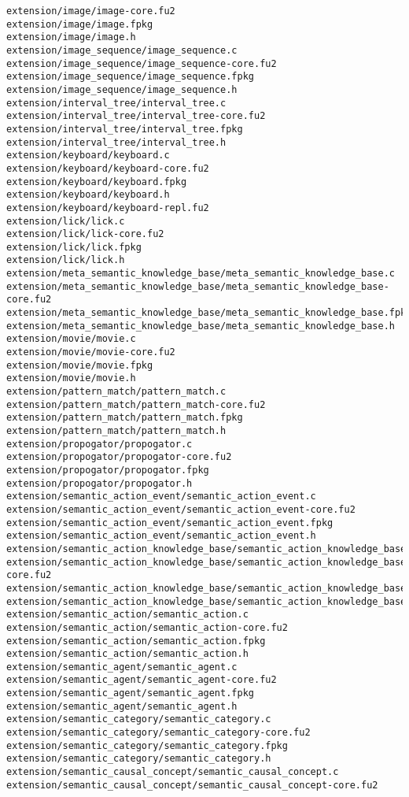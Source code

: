 \begin{lstlisting}
extension/image/image-core.fu2
extension/image/image.fpkg
extension/image/image.h
extension/image_sequence/image_sequence.c
extension/image_sequence/image_sequence-core.fu2
extension/image_sequence/image_sequence.fpkg
extension/image_sequence/image_sequence.h
extension/interval_tree/interval_tree.c
extension/interval_tree/interval_tree-core.fu2
extension/interval_tree/interval_tree.fpkg
extension/interval_tree/interval_tree.h
extension/keyboard/keyboard.c
extension/keyboard/keyboard-core.fu2
extension/keyboard/keyboard.fpkg
extension/keyboard/keyboard.h
extension/keyboard/keyboard-repl.fu2
extension/lick/lick.c
extension/lick/lick-core.fu2
extension/lick/lick.fpkg
extension/lick/lick.h
extension/meta_semantic_knowledge_base/meta_semantic_knowledge_base.c
extension/meta_semantic_knowledge_base/meta_semantic_knowledge_base-core.fu2
extension/meta_semantic_knowledge_base/meta_semantic_knowledge_base.fpkg
extension/meta_semantic_knowledge_base/meta_semantic_knowledge_base.h
extension/movie/movie.c
extension/movie/movie-core.fu2
extension/movie/movie.fpkg
extension/movie/movie.h
extension/pattern_match/pattern_match.c
extension/pattern_match/pattern_match-core.fu2
extension/pattern_match/pattern_match.fpkg
extension/pattern_match/pattern_match.h
extension/propogator/propogator.c
extension/propogator/propogator-core.fu2
extension/propogator/propogator.fpkg
extension/propogator/propogator.h
extension/semantic_action_event/semantic_action_event.c
extension/semantic_action_event/semantic_action_event-core.fu2
extension/semantic_action_event/semantic_action_event.fpkg
extension/semantic_action_event/semantic_action_event.h
extension/semantic_action_knowledge_base/semantic_action_knowledge_base.c
extension/semantic_action_knowledge_base/semantic_action_knowledge_base-core.fu2
extension/semantic_action_knowledge_base/semantic_action_knowledge_base.fpkg
extension/semantic_action_knowledge_base/semantic_action_knowledge_base.h
extension/semantic_action/semantic_action.c
extension/semantic_action/semantic_action-core.fu2
extension/semantic_action/semantic_action.fpkg
extension/semantic_action/semantic_action.h
extension/semantic_agent/semantic_agent.c
extension/semantic_agent/semantic_agent-core.fu2
extension/semantic_agent/semantic_agent.fpkg
extension/semantic_agent/semantic_agent.h
extension/semantic_category/semantic_category.c
extension/semantic_category/semantic_category-core.fu2
extension/semantic_category/semantic_category.fpkg
extension/semantic_category/semantic_category.h
extension/semantic_causal_concept/semantic_causal_concept.c
extension/semantic_causal_concept/semantic_causal_concept-core.fu2

\end{lstlisting}

